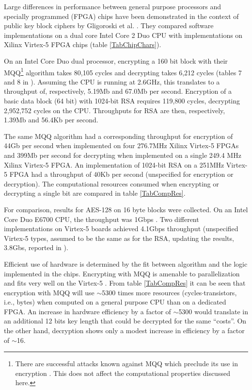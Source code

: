 \documentclass{article}
\begin{document}
Large differences in performance between general purpose processors and specially programmed 
(FPGA) chips have been demonstrated in the context of public key block ciphers by Gligoroski et al.
\cite{Gligoroski0808.0247}. 
They compared software implementations on a dual core Intel Core 2 Duo CPU
with implementations on Xilinx Virtex-5 FPGA chips  (table \ref{TabChipChars}).

On an Intel Core Duo dual processor, encrypting a 160 bit block with their MQQ\footnote{There are
successful attacks known against MQQ which preclude its use in encryption \cite{PersonalGligoroski}.
This does not affect the computational properties discussed here.} algorithm
takes 80,105 cycles and decrypting takes 6,212 cycles (tables 7 and 8 in \cite{Gligoroski0808.0247}). Assuming 
the CPU is running at 2.6GHz, this translates to a throughput of, respectively,  5.19Mb 
and 67.0Mb per second. Encryption of a basic data block (64 bit) with 1024-bit RSA requires
119,800 cycles, decrypting 2,952,752 cycles on the CPU. Throughputs for RSA are then,
respectively, 1.39Mb and 56.4Kb per second.

\begin{comment}
MQQ enc: 160*2.6*10^9/80105
MQQ dec: 160* 2.6*10^9/6212
RSA enc: 64 * 2.6*10^9/119800
RSA dec: 64 * 2.6*10^9/2952752
\end{comment}


The same MQQ algorithm had a corresponding throughput for encryption of 44Gb per second
when implemented on four 276.7MHz Xilinx Virtex-5 FPGAs and 399Mb 
per second for decrypting when implemented on a single 249.4 MHz Xilinx Virtex-5
FPGA. An implementation of 1024-bit RSA on a 251MHz Virtex-5 FPGA had a throughput 
of 40Kb per second (unspecified for encryption or decryption). The computational
resources consumed when encrypting or decrypting a single bit are compared in table 
\ref{TabCompRes}.

For comparison, results for AES-128 on 16 byte blocks were collected. On an Intel Core Duo
E6700 CPU, the throughput was 1Gbps \cite{JemMatzan2006}. Two different implementations 
on Virtex-5 boards 
achieved 4.1Gbps throughput \cite{bulens2008implementation} (unspecified Virtex-5 types, assumed
to be the same as for the RSA, updating the results, 3.8Gbs, reported in \cite{Gligoroski0808.0247}). 

Efficient use of hardware is determined by the fit between algorithm and the logic implemented in the
chips. Encrypting with MQQ is amenable to parallelization and fits very well on the Virtex-5 
\cite{PersonalGligoroski}. From table \ref{TabCompRes} it can be seen that encryption with MQQ will use
$\sim$5300 times more resources (cycles$\cdot$transistors, i.e., bytes) when computed on a general 
purpose CPU than on a dedicated FPGA. 
An increase in hardware efficiency by a factor of $\sim$5300 would translate in an additional 12 bits
key length that could be decrypted for the same ``costs''. On the other hand, decryption shows
only a modest increase in efficiency by a factor of $\sim$16.
\end{document}
